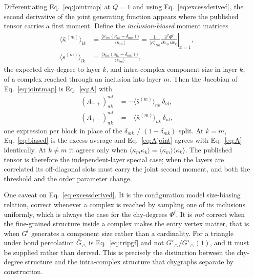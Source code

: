 \documentclass[aps,pre,twocolumn,superscriptaddress,floatfix,longbibliography]{revtex4-2}
\newcommand{\ave}[1]{\langle #1 \rangle}
\begin{document}
Differentiating Eq.~\eqref{eq:jointmap} at $Q=1$ and using
Eq.~\eqref{eq:excessderived}, the second derivative of the joint generating
function appears where the published tensor carries a first moment. Define the
\emph{inclusion-biased} moment matrices
\begin{align}
  \ave{\bar\kappa^{(m)}}_{lk}
    &=\frac{\ave{\kappa_{lm}\left(\kappa_{lk}-\delta_{mk}\right)}}
           {\ave{\kappa_{lm}}}
     =\frac{1}{\ave{\kappa}_{lm}}
      \left.\frac{\partial^2\Phi^l}{\partial x_m\partial x_k}\right|_{x=1},
      \nonumber\\
  \ave{\bar s^{(m)}}_{lk}
    &=\frac{\ave{s_{lm}\left(s_{lk}-\delta_{mk}\right)}}{\ave{s_{lm}}},
  \label{eq:biased}
\end{align}
the expected chy-degree to layer $k$, and intra-complex component size in layer
$k$, of a complex reached through an inclusion into layer $m$. Then the Jacobian
of Eq.~\eqref{eq:jointmap} is Eq.~\eqref{eq:A} with
\begin{align}
  (A_{-+})^{ml}_{nk} &= -\ave{\bar s^{(m)}}_{nk}\,\delta_{nl},\nonumber\\
  (A_{+-})^{ml}_{nk} &= -\ave{\bar\kappa^{(m)}}_{nk}\,\delta_{nl},
  \label{eq:Ajoint}
\end{align}
one expression per block in place of the $\delta_{mk}$ / $(1-\delta_{mk})$ split.
At $k=m$, Eq.~\eqref{eq:biased} is the excess average and
Eq.~\eqref{eq:Ajoint} agrees with Eq.~\eqref{eq:A} identically. At $k\ne m$ it
agrees only when $\ave{\kappa_m\kappa_k}=\ave{\kappa_m}\ave{\kappa_k}$. The
published tensor is therefore the independent-layer special case; when the
layers are correlated its off-diagonal slots must carry the joint second moment,
and both the threshold and the order parameter change.

One caveat on Eq.~\eqref{eq:excessderived}. It is the configuration model
size-biasing relation, correct whenever a complex is reached by sampling one of
its inclusions uniformly, which is always the case for the chy-degrees
$\Phi^l$. It is \emph{not} correct when the fine-grained structure inside a
complex makes the entry vertex matter, that is when $G^l$ generates a component
size rather than a cardinality. For a triangle under bond percolation
$\bar G_\triangle$ is Eq.~\eqref{eq:tripgf} and not $G'_\triangle/G'_\triangle(1)$,
and it must be supplied rather than derived. This is precisely the distinction
between the chy-degree structure and the intra-complex structure that chygraphs
separate by construction.
\end{document}
